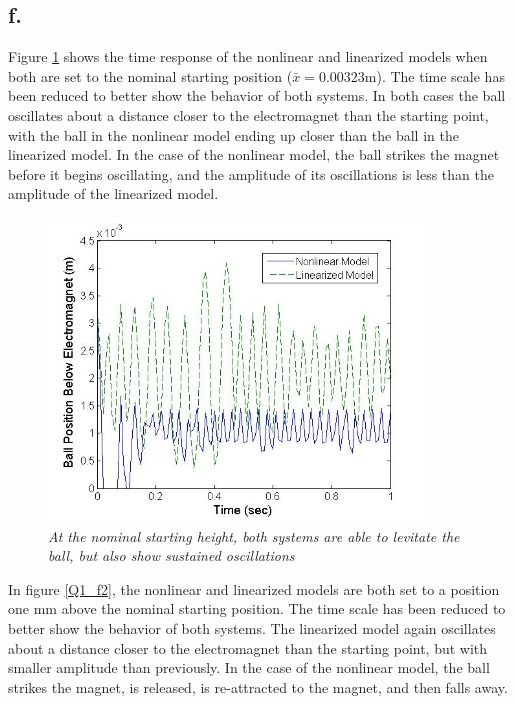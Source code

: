 \documentclass{article}
\theoremstyle{plain}
\theoremstyle{definition}
\theoremstyle{remark}
\begin{document}
\subsection*{f.}
Figure \ref{Q1_f1} shows the time response of the nonlinear and linearized models when both are set to the nominal starting position ($\bar{x} = 0.00323$m). The time scale has been reduced to better show the behavior of both systems. In both cases the ball oscillates about a distance closer to the electromagnet than the starting point, with the ball in the nonlinear model ending up closer than the ball in the linearized model. In the case of the nonlinear model, the ball strikes the magnet before it begins oscillating, and the amplitude of its oscillations is less than the amplitude of the linearized model.\\
\begin{figure}[htb]
\begin{center}
\includegraphics[width = 10cm]{Part1fNoDisturbance}
\caption{\emph{At the nominal starting height, both systems are able to levitate the ball, but also show sustained oscillations }}
\label{Q1_f1}
\end{center}
\end{figure}

In figure \ref{Q1_f2}, the nonlinear and linearized models are both set to a position one mm above the nominal starting position. The time scale has been reduced to better show the behavior of both systems. The linearized model again oscillates about a distance closer to the electromagnet than the starting point, but with smaller amplitude than previously. In the case of the nonlinear model, the ball strikes the magnet, is released, is re-attracted to the magnet, and then falls away.\\
\end{document}
